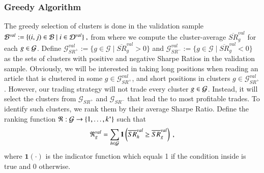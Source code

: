 \subsubsection{Greedy Algorithm}

The greedy selection of clusters is done in the validation sample 
$
\mathcal{B}^{val}:= \{
(i,j)\in\mathcal{B} 
 \mid 
  i \in \mathcal{D}^{val} \}
~,
$
from where we compute the cluster-average $\overline{S R}_g^{val}$ for each $g\in\mathcal{G}$.
%
Define $\mathcal G_{SR^+}^{val}:=\{ g\in \mathcal G \mid \overline{SR}_g^{val} >0\}$ and $\mathcal G_{SR^-}^{val}:=\{ g\in \mathcal G \mid \overline{SR}_g^{val} <0\}$ as the sets of clusters with positive and negative Sharpe Ratios in the validation sample. Obviously, we will be interested in taking long positions when reading an article that is clustered in some $g\in \mathcal G_{SR^+}^{val}$, and short positions in clusters $g\in \mathcal G_{SR^+}^{val}$. 
%
However, our trading strategy will not trade every cluster $g\in\mathcal{G}$. Instead, it will select the clusters from $\mathcal G_{SR^+}$ and $\mathcal G_{SR^-}$ that lead the to most profitable trades. 
To identify such clusters, we rank them by their average Sharpe Ratio. Define the ranking function $\mathfrak{R}: \mathcal{G} \to \left\{1, \ldots, k^*\right\}$ such that
$$
\mathfrak{R}_g^{val}
=
\sum_{h \in \mathcal{G}} 
\mathbf{1}\left(
\overline{S R}_h^{val} \geq \overline{S R}_g^{val} 
\right)
~,
$$
where $\mathbf{1}(\cdot)$ is the indicator function which equals 1 if the condition inside is true and 0 otherwise.

